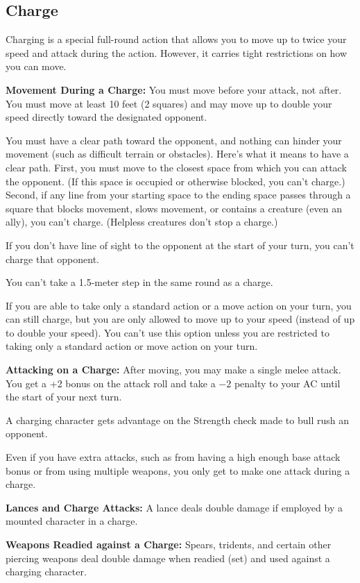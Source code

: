 \subsection{Charge}
Charging is a special full-round action that allows you to move up to twice your speed and attack during the action. However, it carries tight restrictions on how you can move.

\textbf{Movement During a Charge:} You must move before your attack, not after. You must move at least 10 feet (2 squares) and may move up to double your speed directly toward the designated opponent.

You must have a clear path toward the opponent, and nothing can hinder your movement (such as difficult terrain or obstacles). Here's what it means to have a clear path. First, you must move to the closest space from which you can attack the opponent. (If this space is occupied or otherwise blocked, you can't charge.) Second, if any line from your starting space to the ending space passes through a square that blocks movement, slows movement, or contains a creature (even an ally), you can't charge. (Helpless creatures don't stop a charge.)

If you don't have line of sight to the opponent at the start of your turn, you can't charge that opponent.

You can't take a 1.5-meter step in the same round as a charge.

If you are able to take only a standard action or a move action on your turn, you can still charge, but you are only allowed to move up to your speed (instead of up to double your speed). You can't use this option unless you are restricted to taking only a standard action or move action on your turn.

\textbf{Attacking on a Charge:} After moving, you may make a single melee attack. You get a +2 bonus on the attack roll and take a $-2$ penalty to your AC until the start of your next turn.

A charging character gets advantage on the Strength check made to bull rush an opponent.

Even if you have extra attacks, such as from having a high enough base attack bonus or from using multiple weapons, you only get to make one attack during a charge.

\textbf{Lances and Charge Attacks:} A lance deals double damage if employed by a mounted character in a charge.

\textbf{Weapons Readied against a Charge:} Spears, tridents, and certain other piercing weapons deal double damage when readied (set) and used against a charging character.